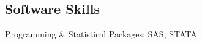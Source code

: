 \documentclass[margin,line]{res}
\begin{document}
\begin{resume}
\section{\sc Software Skills} Programming \& Statistical Packages: SAS, STATA

%
%
%


\end{resume}
\end{document}
